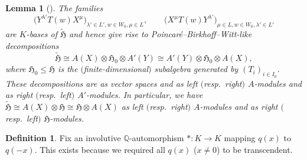 \documentclass[pdftex]{sigma}
\newtheorem{Lemma}[Theorem]{Lemma}
\theoremstyle{definition}
\newtheorem{Definition}[Theorem]{Definition}
\numberwithin{equation}{section}
\begin{document}
\begin{Lemma}[{\cite[Section~4.7.5]{macdonald}}]\label{sec:lem-basis-daha}
 The families
 \[
 \bigl(Y^{\lambda'}T(w)X^\mu\bigr)_{\lambda'\in L', w\in W_0, \mu\in L},\qquad
 \bigl(X^\mu T(w) Y^{\lambda'}\bigr)_{\mu\in L, w\in W_0, \lambda'\in L'}
 \]
 are $K$-bases of
 $\tilde{\mathfrak{H}}$ and hence give rise to Poincar\'e--Birkhoff--Witt-like
 decompositions
 \[
 \tilde{\mathfrak{H}}\cong A(X)\otimes\mathfrak{H}_0\otimes A'(Y)
 \cong A'(Y)\otimes\mathfrak{H}_0\otimes A(X),
 \]
 where $\mathfrak{H}_0\le\mathfrak{H}$ is the $($finite-dimensional$)$
 subalgebra generated by $(T_i)_{i\in I_0}$. These decompositions are
 as vector spaces and as left $($resp.\ right$)$ $A$-modules and as
 right $($resp.\ left$)$ $A'$-modules. In particular, we have
$
 \tilde{\mathfrak{H}}\cong A(X)\otimes\mathfrak{H} \cong \mathfrak{H}\otimes A(X)
$
 as left $($resp.\ right$)$ $A$-modules and as right $($resp.\ left$)$
 $\mathfrak{H}$-modules.
\end{Lemma}

\begin{Definition}
 Fix an involutive $\mathbb{Q}$-automorphism $*\colon K\to K$ mapping $q(x)$ to $q(-x)$.
 This exists because we required all $q(x)$ ($x\ne0$) to be transcendent.
\end{Definition}
\end{document}
